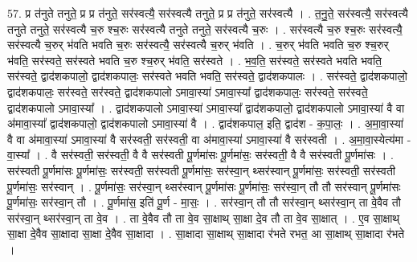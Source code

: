 \documentclass[17pt]{extarticle}
\begin{document}
57. प्र त॑नुते तनुते॒ प्र प्र त॑नुते॒ सर॑स्वत्यै॒ सर॑स्वत्यै तनुते॒ प्र प्र त॑नुते॒ सर॑स्वत्यै । . त॒नु॒ते॒ सर॑स्वत्यै॒ सर॑स्वत्यै तनुते तनुते॒ सर॑स्वत्यै च॒रु श्च॒रुः सर॑स्वत्यै तनुते तनुते॒ सर॑स्वत्यै च॒रुः । . सर॑स्वत्यै च॒रु श्च॒रुः सर॑स्वत्यै॒ सर॑स्वत्यै च॒रुर् भ॑वति भवति च॒रुः सर॑स्वत्यै॒ सर॑स्वत्यै च॒रुर् भ॑वति । . च॒रुर् भ॑वति भवति च॒रु श्च॒रुर् भ॑वति॒ सर॑स्वते॒ सर॑स्वते भवति च॒रु श्च॒रुर् भ॑वति॒ सर॑स्वते । . भ॒व॒ति॒ सर॑स्वते॒ सर॑स्वते भवति भवति॒ सर॑स्वते॒ द्वाद॑शकपालो॒ द्वाद॑शकपालः॒ सर॑स्वते भवति भवति॒ सर॑स्वते॒ द्वाद॑शकपालः । . सर॑स्वते॒ द्वाद॑शकपालो॒ द्वाद॑शकपालः॒ सर॑स्वते॒ सर॑स्वते॒ द्वाद॑शकपालो ऽमावा॒स्या॑ ऽमावा॒स्या᳚ द्वाद॑शकपालः॒ सर॑स्वते॒ सर॑स्वते॒ द्वाद॑शकपालो ऽमावा॒स्या᳚ । . द्वाद॑शकपालो ऽमावा॒स्या॑ ऽमावा॒स्या᳚ द्वाद॑शकपालो॒ द्वाद॑शकपालो ऽमावा॒स्या॑ वै वा अ॑मावा॒स्या᳚ द्वाद॑शकपालो॒ द्वाद॑शकपालो ऽमावा॒स्या॑ वै । . द्वाद॑शकपाल॒ इति॒ द्वाद॑श - क॒पा॒लः॒ । . अ॒मा॒वा॒स्या॑ वै वा अ॑मावा॒स्या॑ ऽमावा॒स्या॑ वै सर॑स्वती॒ सर॑स्वती॒ वा अ॑मावा॒स्या॑ ऽमावा॒स्या॑ वै सर॑स्वती । . अ॒मा॒वा॒स्येत्य॑मा - वा॒स्या᳚ । . वै सर॑स्वती॒ सर॑स्वती॒ वै वै सर॑स्वती पू॒र्णमा॑सः पू॒र्णमा॑सः॒ सर॑स्वती॒ वै वै सर॑स्वती पू॒र्णमा॑सः । . सर॑स्वती पू॒र्णमा॑सः पू॒र्णमा॑सः॒ सर॑स्वती॒ सर॑स्वती पू॒र्णमा॑सः॒ सर॑स्वा॒न् थ्सर॑स्वान् पू॒र्णमा॑सः॒ सर॑स्वती॒ सर॑स्वती पू॒र्णमा॑सः॒ सर॑स्वान् । . पू॒र्णमा॑सः॒ सर॑स्वा॒न् थ्सर॑स्वान् पू॒र्णमा॑सः पू॒र्णमा॑सः॒ सर॑स्वा॒न् तौ तौ सर॑स्वान् पू॒र्णमा॑सः पू॒र्णमा॑सः॒ सर॑स्वा॒न् तौ । . पू॒र्णमा॑स॒ इति॑ पू॒र्ण - मा॒सः॒ । . सर॑स्वा॒न् तौ तौ सर॑स्वा॒न् थ्सर॑स्वा॒न् ता वे॒वैव तौ सर॑स्वा॒न् थ्सर॑स्वा॒न् ता वे॒व । . ता वे॒वैव तौ ता वे॒व सा॒क्षाथ् सा॒क्षा दे॒व तौ ता वे॒व सा॒क्षात् । . ए॒व सा॒क्षाथ् सा॒क्षा दे॒वैव सा॒क्षादा सा॒क्षा दे॒वैव सा॒क्षादा । . सा॒क्षादा सा॒क्षाथ् सा॒क्षादा र॑भते रभत॒ आ सा॒क्षाथ् सा॒क्षादा र॑भते । \newline
\end{document}
